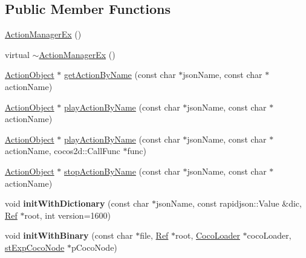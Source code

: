 \subsection*{Public Member Functions}
\begin{DoxyCompactItemize}
\item 
\hyperlink{classcocostudio_1_1ActionManagerEx_adf660952e77be05f9a9d22fcffaae3cc}{Action\+Manager\+Ex} ()
\item 
virtual \hyperlink{classcocostudio_1_1ActionManagerEx_aaa28f8fdcbe2a8155d39c636d6ceb2e6}{$\sim$\+Action\+Manager\+Ex} ()
\item 
\hyperlink{classcocostudio_1_1ActionObject}{Action\+Object} $\ast$ \hyperlink{classcocostudio_1_1ActionManagerEx_a40087ddcdb2776834b69faca4d3a670c}{get\+Action\+By\+Name} (const char $\ast$json\+Name, const char $\ast$action\+Name)
\item 
\hyperlink{classcocostudio_1_1ActionObject}{Action\+Object} $\ast$ \hyperlink{classcocostudio_1_1ActionManagerEx_a801c1db6d848b9957c82739a5878cae0}{play\+Action\+By\+Name} (const char $\ast$json\+Name, const char $\ast$action\+Name)
\item 
\hyperlink{classcocostudio_1_1ActionObject}{Action\+Object} $\ast$ \hyperlink{classcocostudio_1_1ActionManagerEx_a9c8f084cbe82ff09dc1324448fcfffd3}{play\+Action\+By\+Name} (const char $\ast$json\+Name, const char $\ast$action\+Name, cocos2d\+::\+Call\+Func $\ast$func)
\item 
\hyperlink{classcocostudio_1_1ActionObject}{Action\+Object} $\ast$ \hyperlink{classcocostudio_1_1ActionManagerEx_ad69b7ac6c5a1ba69ca734967b2b5dfe3}{stop\+Action\+By\+Name} (const char $\ast$json\+Name, const char $\ast$action\+Name)
\item 
\mbox{\label{classcocostudio_1_1ActionManagerEx_a84d40f6da2ff54e4df25195dff2d1f62}} 
void {\bfseries init\+With\+Dictionary} (const char $\ast$json\+Name, const rapidjson\+::\+Value \&dic, \hyperlink{classRef}{Ref} $\ast$root, int version=1600)
\item 
\mbox{\label{classcocostudio_1_1ActionManagerEx_af3ce7cfaa113bc66c313e292659e35b1}} 
void {\bfseries init\+With\+Binary} (const char $\ast$file, \hyperlink{classRef}{Ref} $\ast$root, \hyperlink{classcocostudio_1_1CocoLoader}{Coco\+Loader} $\ast$coco\+Loader, \hyperlink{structcocostudio_1_1stExpCocoNode}{st\+Exp\+Coco\+Node} $\ast$p\+Coco\+Node)
\item 

\end{DoxyCompactItemize}
